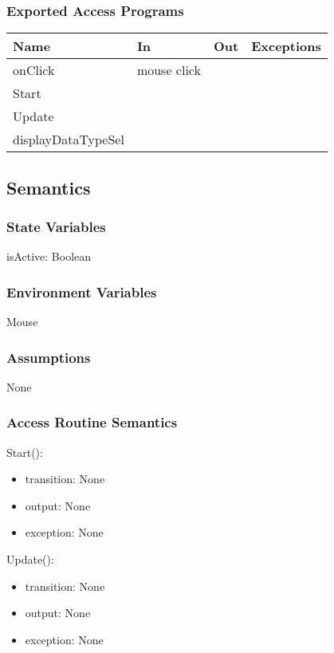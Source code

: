 \documentclass[12pt, titlepage]{article}
\begin{document}
\subsubsection{Exported Access Programs}

\begin{center}
\begin{tabular}{| l | l | l | p{5cm}|}
\hline
\textbf{Name} & \textbf{In} & \textbf{Out} & \textbf{Exceptions} \\
\hline
onClick & mouse click &  &  \\
\hline
Start &&&\\
\hline
Update &&&\\
\hline
displayDataTypeSel &&&\\
\hline
\end{tabular}
\end{center}

\subsection{Semantics}

\subsubsection{State Variables}
isActive: Boolean

\subsubsection{Environment Variables}
Mouse
\subsubsection{Assumptions}
None
\subsubsection{Access Routine Semantics}

\noindent Start():
\begin{itemize}
\item transition: None
\item output: None
\item exception: None
\end{itemize}

\noindent Update():
\begin{itemize}
\item transition: None
\item output: None
\item exception: None
\end{itemize}
\end{document}
